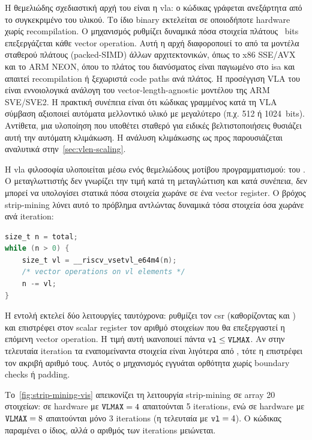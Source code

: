 Η θεμελιώδης σχεδιαστική αρχή του \RVV είναι η \gls{vla}: ο κώδικας
γράφεται ανεξάρτητα από το συγκεκριμένο \VLEN του υλικού. Το ίδιο binary
εκτελείται σε οποιοδήποτε hardware \VLEN χωρίς recompilation. Ο μηχανισμός
 ρυθμίζει δυναμικά πόσα
στοιχεία πλάτους \SEW~bits επεξεργάζεται κάθε vector operation. Αυτή η
αρχή διαφοροποιεί το \RVV από τα μοντέλα σταθερού πλάτους (packed-SIMD)
άλλων αρχιτεκτονικών, όπως το x86 SSE/AVX και το ARM NEON, όπου το πλάτος
του διανύσματος είναι παγιωμένο στο \gls{isa} και απαιτεί recompilation ή
ξεχωριστά code paths ανά πλάτος. Η προσέγγιση VLA του \RVV είναι
εννοιολογικά ανάλογη του vector-length-agnostic μοντέλου της ARM
SVE/SVE2. Η πρακτική συνέπεια είναι ότι κώδικας γραμμένος κατά τη VLA
σύμβαση αξιοποιεί αυτόματα μελλοντικό υλικό με μεγαλύτερο \VLEN (π.χ.
\num{512} ή \num{1024}~bits). Αντίθετα, μια υλοποίηση που υποθέτει σταθερό
\VLEN για ειδικές βελτιστοποιήσεις θυσιάζει αυτή την αυτόματη κλιμάκωση. Η
ανάλυση κλιμάκωσης ως προς \VLEN παρουσιάζεται αναλυτικά στην~\cref{sec:vlen-scaling}.

Η \gls{vla} φιλοσοφία υλοποιείται μέσω ενός θεμελιώδους μοτίβου
προγραμματισμού: του . Ο μεταγλωττιστής δεν γνωρίζει
την τιμή \VLEN κατά τη μεταγλώττιση και κατά συνέπεια, δεν μπορεί να
υπολογίσει στατικά πόσα στοιχεία χωράνε σε ένα vector register. Ο βρόχος
strip-mining λύνει αυτό το πρόβλημα αντλώντας δυναμικά τόσα στοιχεία όσα
χωράνε ανά iteration:

\begin{lstlisting}[language=C, caption={Θεμελιώδες μοτίβο strip-mining σε
  \RVV. Η \code{vsetvl} επιστρέφει $\code{vl} = \min(n, \VLMAX)$.},
  label={lst:strip-mining-pattern}]
size_t n = total;
while (n > 0) {
    size_t vl = __riscv_vsetvl_e64m4(n);
    /* vector operations on vl elements */
    n -= vl;
}
\end{lstlisting}

Η εντολή  εκτελεί δύο λειτουργίες ταυτόχρονα: ρυθμίζει τον
\gls{csr}  (καθορίζοντας \SEW και \LMUL) και επιστρέφει στον
scalar register  τον αριθμό στοιχείων που θα επεξεργαστεί η
επόμενη vector operation. Η τιμή αυτή ικανοποιεί πάντα
$\texttt{vl} \leq \texttt{VLMAX}$. Αν στην τελευταία iteration τα εναπομείναντα
στοιχεία είναι λιγότερα από \VLMAX, τότε η  επιστρέφει τον
ακριβή αριθμό τους. Αυτός ο μηχανισμός εγγυάται ορθότητα χωρίς
boundary checks ή padding.

Το~\cref{fig:strip-mining-vis} απεικονίζει τη λειτουργία strip-mining σε
array \num{20} στοιχείων: σε hardware με $\texttt{VLMAX} = 4$ απαιτούνται \num{5}
iterations, ενώ σε hardware με $\texttt{VLMAX} = 8$ απαιτούνται μόνο \num{3}
iterations (η τελευταία με $\texttt{vl} = 4$). Ο κώδικας παραμένει ο ίδιος, 
αλλά ο αριθμός των iterations μειώνεται.

